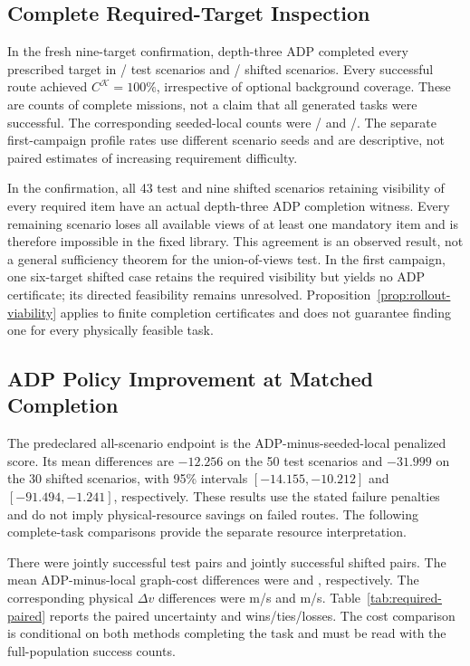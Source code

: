 \subsection{Complete Required-Target Inspection}

In the fresh nine-target confirmation, depth-three ADP completed every prescribed target in \RTTestSuccess/\RTTestN{} test scenarios and \RTOodSuccess/\RTOodN{} shifted scenarios. Every successful route achieved $C^{\mathcal K}=100\%$, irrespective of optional background coverage. These are counts of complete missions, not a claim that all generated tasks were successful. The corresponding seeded-local counts were \RTLocalTestSuccess/\RTTestN{} and \RTLocalOodSuccess/\RTOodN{}. The separate first-campaign profile rates use different scenario seeds and are descriptive, not paired estimates of increasing requirement difficulty.




In the confirmation, all 43 test and nine shifted scenarios retaining visibility of every required item have an actual depth-three ADP completion witness. Every remaining scenario loses all available views of at least one mandatory item and is therefore impossible in the fixed library. This agreement is an observed result, not a general sufficiency theorem for the union-of-views test. In the first campaign, one six-target shifted case retains the required visibility but yields no ADP certificate; its directed feasibility remains unresolved. Proposition~\ref{prop:rollout-viability} applies to finite completion certificates and does not guarantee finding one for every physically feasible task.

\subsection{ADP Policy Improvement at Matched Completion}

The predeclared all-scenario endpoint is the ADP-minus-seeded-local penalized score. Its mean differences are $-12.256$ on the 50 test scenarios and $-31.999$ on the 30 shifted scenarios, with 95\% intervals $[-14.155,-10.212]$ and $[-91.494,-1.241]$, respectively. These results use the stated failure penalties and do not imply physical-resource savings on failed routes. The following complete-task comparisons provide the separate resource interpretation.

There were \RTJointTestN{} jointly successful test pairs and \RTJointOodN{} jointly successful shifted pairs. The mean ADP-minus-local graph-cost differences were \RTTestCostDiff{} and \RTOodCostDiff{}, respectively. The corresponding physical $\Delta v$ differences were \unit{\RTTestDvDiff}{m/s} and \unit{\RTOodDvDiff}{m/s}. Table~\ref{tab:required-paired} reports the paired uncertainty and wins/ties/losses. The cost comparison is conditional on both methods completing the task and must be read with the full-population success counts.

